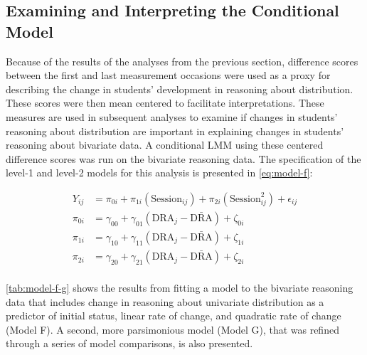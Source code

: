 \documentclass[11pt]{umnthesis}
\begin{document}
\hypertarget{examining-and-interpreting-the-conditional-model}{%
\subsection{Examining and Interpreting the Conditional Model}\label{examining-and-interpreting-the-conditional-model}}

Because of the results of the analyses from the previous section, difference scores between the first and last measurement occasions were used as a proxy for describing the change in students' development in reasoning about distribution. These scores were then mean centered to facilitate interpretations. These measures are used in subsequent analyses to examine if changes in students' reasoning about distribution are important in explaining changes in students' reasoning about bivariate data. A conditional LMM using these centered difference scores was run on the bivariate reasoning data. The specification of the level-1 and level-2 models for this analysis is presented in \autoref{eq:model-f}:

\begin{equation}\label{eq:model-f}
\begin{split}
Y_{ij} &= \pi_{0i} + \pi_{1i}(\mathrm{Session}_{ij}) + \pi_{2i}(\mathrm{Session}_{ij}^2) + \epsilon_{ij}\\[2ex]
\pi_{0i} &= \gamma_{00} + \gamma_{01}(\mathrm{DRA}_{j}-\bar{\mathrm{DRA}}) + \zeta_{0i}\\[1ex]
\pi_{1i} &= \gamma_{10} + \gamma_{11}(\mathrm{DRA}_{j}-\bar{\mathrm{DRA}}) + \zeta_{1i}\\[1ex]
\pi_{2i} &= \gamma_{20} + \gamma_{21}(\mathrm{DRA}_{j}-\bar{\mathrm{DRA}}) + \zeta_{2i}\\[1ex]
\end{split}
\end{equation}

\ref{tab:model-f-g} shows the results from fitting a model to the bivariate reasoning data that includes change in reasoning about univariate distribution as a predictor of initial status, linear rate of change, and quadratic rate of change (Model F). A second, more parsimonious model (Model G), that was refined through a series of model comparisons, is also presented.
\end{document}
